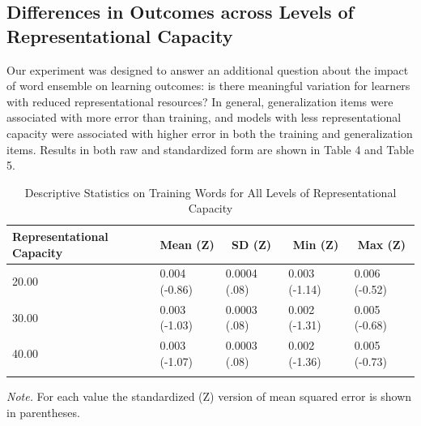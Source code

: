 \documentclass[
  ,man,floatsintext]{apa6}
\begin{document}
\hypertarget{differences-in-outcomes-across-levels-of-representational-capacity}{%
\subsection{Differences in Outcomes across Levels of Representational Capacity}\label{differences-in-outcomes-across-levels-of-representational-capacity}}

Our experiment was designed to answer an additional question about the impact of word ensemble on learning outcomes: is there meaningful variation for learners with reduced representational resources? In general, generalization items were associated with more error than training, and models with less representational capacity were associated with higher error in both the training and generalization items. Results in both raw and standardized form are shown in Table 4 and Table 5.

\begin{table}[tbp]

\begin{center}
\begin{threeparttable}

\caption{\label{tab:table4}Descriptive Statistics on Training Words for All Levels of Representational Capacity}

\begin{tabular}{lllll}
\toprule
Representational Capacity & \multicolumn{1}{c}{Mean (Z)} & \multicolumn{1}{c}{SD (Z)} & \multicolumn{1}{c}{Min (Z)} & \multicolumn{1}{c}{Max (Z)}\\
\midrule
20.00 & 0.004 (-0.86) & 0.0004 (.08) & 0.003 (-1.14) & 0.006 (-0.52)\\
30.00 & 0.003 (-1.03) & 0.0003 (.08) & 0.002 (-1.31) & 0.005 (-0.68)\\
40.00 & 0.003 (-1.07) & 0.0003 (.08) & 0.002 (-1.36) & 0.005 (-0.73)\\
\bottomrule
\addlinespace
\end{tabular}

\begin{tablenotes}[para]
\normalsize{\textit{Note.} For each value the standardized (Z) version of mean squared error is shown in parentheses.}
\end{tablenotes}

\end{threeparttable}
\end{center}

\end{table}
\end{document}
